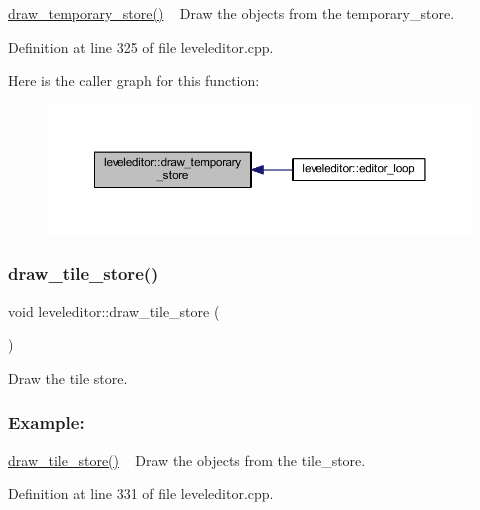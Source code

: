 \hyperlink{classleveleditor_a3478cade84f5ff58c06df2c173c9127d}{draw\+\_\+temporary\+\_\+store()} ~\newline
Draw the objects from the temporary\+\_\+store. ~\newline


Definition at line 325 of file leveleditor.\+cpp.

Here is the caller graph for this function\+:
\nopagebreak
\begin{figure}[H]
\begin{center}
\leavevmode
\includegraphics[width=350pt]{classleveleditor_a3478cade84f5ff58c06df2c173c9127d_icgraph}
\end{center}
\end{figure}
\mbox{\label{classleveleditor_ac87f89b0889c243ab43cfbbc7fd70836}} 
\subsubsection{\texorpdfstring{draw\+\_\+tile\+\_\+store()}{draw\_tile\_store()}}
{\footnotesize\ttfamily void leveleditor\+::draw\+\_\+tile\+\_\+store (\begin{DoxyParamCaption}{ }\end{DoxyParamCaption})}



Draw the tile store. 

\subsubsection*{Example\+: }

\hyperlink{classleveleditor_ac87f89b0889c243ab43cfbbc7fd70836}{draw\+\_\+tile\+\_\+store()} ~\newline
Draw the objects from the tile\+\_\+store. ~\newline


Definition at line 331 of file leveleditor.\+cpp.

